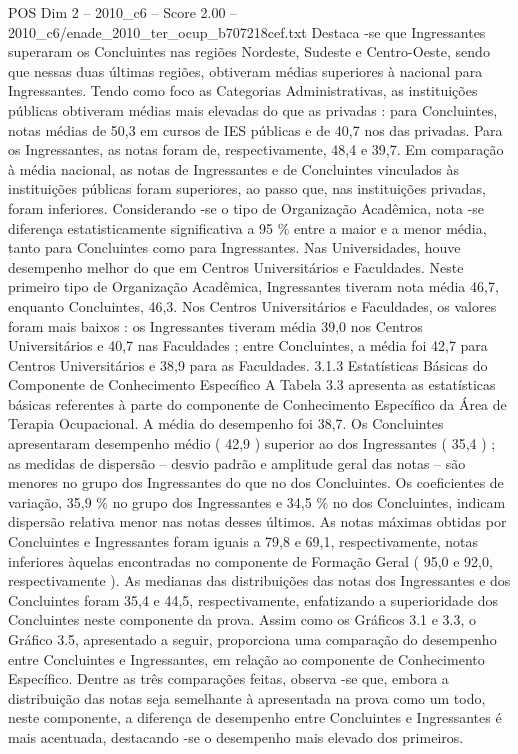 \begin{textsample}{POS Dim 2 – 2010\_c6 – Score 2.00 – 2010\_c6/enade\_2010\_ter\_ocup\_b707218cef.txt}
Destaca -se que Ingressantes superaram os Concluintes nas regiões Nordeste, Sudeste e Centro-Oeste, sendo que nessas duas últimas regiões, obtiveram médias superiores à nacional para Ingressantes.
Tendo como foco as Categorias Administrativas, as instituições públicas obtiveram médias mais elevadas do que as privadas : para Concluintes, notas médias de 50,3 em cursos de IES públicas e de 40,7 nos das privadas.
Para os Ingressantes, as notas foram de, respectivamente, 48,4 e 39,7.
Em comparação à média nacional, as notas de Ingressantes e de Concluintes vinculados às instituições públicas foram superiores, ao passo que, nas instituições privadas, foram inferiores.
Considerando -se o tipo de Organização Acadêmica, nota -se diferença estatisticamente significativa a 95 \% entre a maior e a menor média, tanto para Concluintes como para Ingressantes.
Nas Universidades, houve desempenho melhor do que em Centros Universitários e Faculdades.
Neste primeiro tipo de Organização Acadêmica, Ingressantes tiveram nota média 46,7, enquanto Concluintes, 46,3.
Nos Centros Universitários e Faculdades, os valores foram mais baixos : os Ingressantes tiveram média 39,0 nos Centros Universitários e 40,7 nas Faculdades ; entre Concluintes, a média foi 42,7 para Centros Universitários e 38,9 para as Faculdades. 3.1.3 Estatísticas Básicas do Componente de Conhecimento Específico A Tabela 3.3 apresenta as estatísticas básicas referentes à parte do componente de Conhecimento Específico da Área de Terapia Ocupacional.
A média do desempenho foi 38,7.
Os Concluintes apresentaram desempenho médio ( 42,9 ) superior ao dos Ingressantes ( 35,4 ) ; as medidas de dispersão – desvio padrão e amplitude geral das notas – são menores no grupo dos Ingressantes do que no dos Concluintes.
Os coeficientes de variação, 35,9 \% no grupo dos Ingressantes e 34,5 \% no dos Concluintes, indicam dispersão relativa menor nas notas desses últimos.
As notas máximas obtidas por Concluintes e Ingressantes foram iguais a 79,8 e 69,1, respectivamente, notas inferiores àquelas encontradas no componente de Formação Geral ( 95,0 e 92,0, respectivamente ).
As medianas das distribuições das notas dos Ingressantes e dos Concluintes foram 35,4 e 44,5, respectivamente, enfatizando a superioridade dos Concluintes neste componente da prova.
Assim como os Gráficos 3.1 e 3.3, o Gráfico 3.5, apresentado a seguir, proporciona uma comparação do desempenho entre Concluintes e Ingressantes, em relação ao componente de Conhecimento Específico.
Dentre as três comparações feitas, observa -se que, embora a distribuição das notas seja semelhante à apresentada na prova como um todo, neste componente, a diferença de desempenho entre Concluintes e Ingressantes é mais acentuada, destacando -se o desempenho mais elevado dos primeiros.

\end{textsample}
